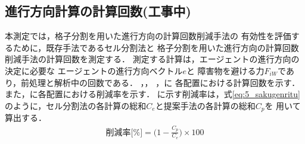 

\clearpage
\subsection{進行方向計算の計算回数(工事中)}
本測定では，格子分割を用いた進行方向の計算回数削減手法の
有効性を評価するために，既存手法であるセル分割法と
格子分割を用いた進行方向の計算回数削減手法の計算回数を測定する．
測定する計算は，エージェントの進行方向の決定に必要な
エージェントの進行方向ベクトル$e$と
障害物を避ける力$F_{iW}$であり，前処理と解析中の回数である．
，，
，に
各配置における計算回数を示す．
また，に各配置における削減率を示す．
に示す削減率は，式\eqref{eq:5_sakugenritu}
のように，セル分割法の各計算の総和$C_e$と提案手法の各計算の総和$C_p$を
用いて算出する．
%
\begin{eqnarray}
\mbox{削減率[\%]} = \Big ( 1 - \frac{C_p}{C_e}  \Big) \times 100
\label{eq:5_sakugenritu}
\end{eqnarray}
%

